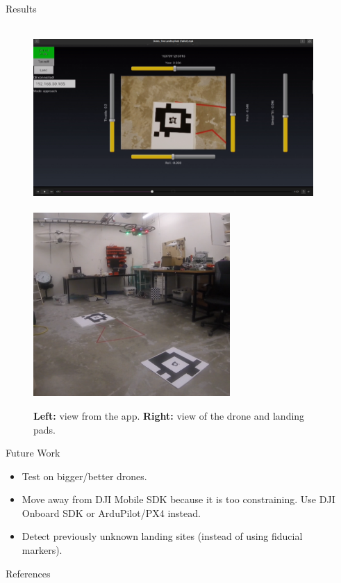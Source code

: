 \documentclass[final, 20pt]{beamer}
\newlength{\sepwidth}
\newlength{\colwidth}
\newcommand{\separatorcolumn}{\begin{column}{\sepwidth}\end{column}}
\begin{document}
\begin{frame}[t]
\begin{columns}[t]
\begin{column}{\colwidth}
\begin{block}{Results}
    \begin{figure}
      \centering
      \includegraphics[height=7cm]{images/tablet_screenshot}
      \hspace{1cm}
      \includegraphics[height=7cm]{images/drone_screenshot}
      \caption{\textbf{Left:} view from the app. \textbf{Right:} view of the drone and landing pads.}
    \end{figure}

  \end{block}

  \begin{block}{Future Work}
    \begin{itemize}
      \item Test on bigger/better drones.
      \item Move away from DJI Mobile SDK because it is too constraining.
            Use DJI Onboard SDK or ArduPilot/PX4 instead.
      \item Detect previously unknown landing sites (instead of using fiducial markers).
    \end{itemize}
  \end{block}

  \vspace{5cm}
  \begin{block}{References}

    \nocite{*}
    \footnotesize{}

  \end{block}

\end{column}

\separatorcolumn
\end{columns}
\end{frame}
\end{document}
